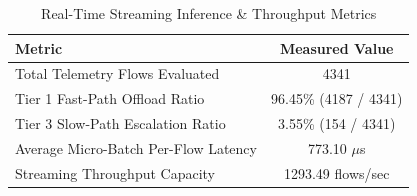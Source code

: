 \begin{table}[htbp]
\centering
\caption{Real-Time Streaming Inference \& Throughput Metrics}
\label{tab:realtime_metrics}
\begin{tabular}{lc}
\hline
\textbf{Metric} & \textbf{Measured Value} \\ \hline
Total Telemetry Flows Evaluated & 4341 \\
Tier 1 Fast-Path Offload Ratio & 96.45\% (4187 / 4341) \\
Tier 3 Slow-Path Escalation Ratio & 3.55\% (154 / 4341) \\
Average Micro-Batch Per-Flow Latency & 773.10 $\mu$s \\
Streaming Throughput Capacity & 1293.49 flows/sec \\ \hline
\end{tabular}
\end{table}
